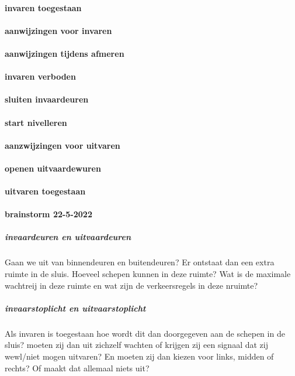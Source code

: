 \documentclass[11pt]{report} %
\begin{document}
\paragraph{invaren toegestaan}

\paragraph{aanwijzingen voor invaren}
\paragraph{aanwijzingen tijdens afmeren}

\paragraph{invaren verboden}

\paragraph{sluiten invaardeuren}

\paragraph{start nivelleren}

\paragraph{aanzwijzingen voor uitvaren}
\paragraph{openen uitvaardewuren}

\paragraph{uitvaren toegestaan}




\paragraph{brainstorm 22-5-2022}

\subparagraph{invaardeuren en uitvaardeuren}
Gaan we uit van binnendeuren en buitendeuren? Er ontstaat dan een extra ruimte in de sluis. Hoeveel schepen kunnen in deze ruimte? Wat is de maximale wachtreij in deze ruimte en wat zijn de verkeersregels in deze nruimte?
\subparagraph{invaarstoplicht en uitvaarstoplicht}
Als invaren is toegestaan hoe wordt dit dan doorgegeven aan de schepen in de sluis? moeten zij dan uit zichzelf wachten of krijgen zij een signaal dat zij wewl/niet mogen uitvaren? En moeten zij dan kiezen voor links, midden of rechts? Of maakt dat allemaal niets uit?
\end{document}
